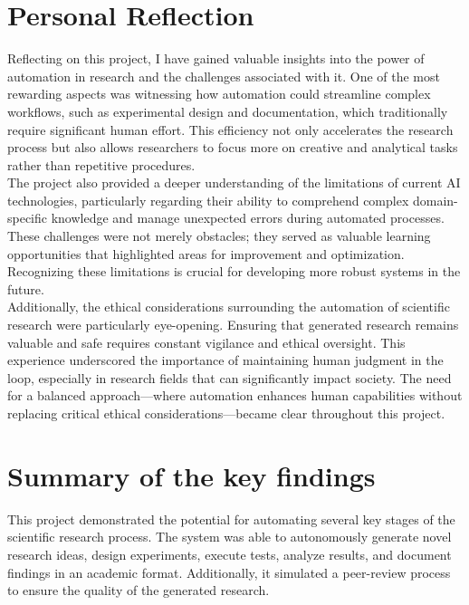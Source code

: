 \section{Personal Reflection}
Reflecting on this project, I have gained valuable insights into the power of automation in research and the challenges associated with it. One of the most rewarding aspects was witnessing how automation could streamline complex workflows, such as experimental design and documentation, which traditionally require significant human effort. This efficiency not only accelerates the research process but also allows researchers to focus more on creative and analytical tasks rather than repetitive procedures.\\
The project also provided a deeper understanding of the limitations of current AI technologies, particularly regarding their ability to comprehend complex domain-specific knowledge and manage unexpected errors during automated processes. These challenges were not merely obstacles; they served as valuable learning opportunities that highlighted areas for improvement and optimization. Recognizing these limitations is crucial for developing more robust systems in the future.\\
Additionally, the ethical considerations surrounding the automation of scientific research were particularly eye-opening. Ensuring that generated research remains valuable and safe requires constant vigilance and ethical oversight. This experience underscored the importance of maintaining human judgment in the loop, especially in research fields that can significantly impact society. The need for a balanced approach—where automation enhances human capabilities without replacing critical ethical considerations—became clear throughout this project.

\section{Summary of the key findings}
This project demonstrated the potential for automating several key stages of the scientific research process. The system was able to autonomously generate novel research ideas, design experiments, execute tests, analyze results, and document findings in an academic format. Additionally, it simulated a peer-review process to ensure the quality of the generated research.

